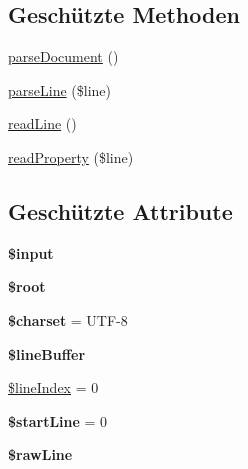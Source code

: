 \subsection*{Geschützte Methoden}
\begin{DoxyCompactItemize}
\item 
\mbox{\hyperlink{class_sabre_1_1_v_object_1_1_parser_1_1_mime_dir_ad1f7ba30d0dba703bfe54a3e3d314f38}{parse\+Document}} ()
\item 
\mbox{\hyperlink{class_sabre_1_1_v_object_1_1_parser_1_1_mime_dir_a4b695104272796834e37bb428c0ad629}{parse\+Line}} (\$line)
\item 
\mbox{\hyperlink{class_sabre_1_1_v_object_1_1_parser_1_1_mime_dir_ad6b4cd149ad202f7aaa162844d484665}{read\+Line}} ()
\item 
\mbox{\hyperlink{class_sabre_1_1_v_object_1_1_parser_1_1_mime_dir_a59f31eadb05920e4ab6de183e02870bb}{read\+Property}} (\$line)
\end{DoxyCompactItemize}
\subsection*{Geschützte Attribute}
\begin{DoxyCompactItemize}
\item 
\mbox{\label{class_sabre_1_1_v_object_1_1_parser_1_1_mime_dir_ab4df6a9f5d7d433b954b5adb6e08ccb9}} 
{\bfseries \$input}
\item 
\mbox{\label{class_sabre_1_1_v_object_1_1_parser_1_1_mime_dir_a49c0dfbae52ea8694721dc062057de4b}} 
{\bfseries \$root}
\item 
\mbox{\label{class_sabre_1_1_v_object_1_1_parser_1_1_mime_dir_ab96f90cb247c15eb6e16b45ac0036a43}} 
{\bfseries \$charset} = \textquotesingle{}U\+TF-\/8\textquotesingle{}
\item 
\mbox{\label{class_sabre_1_1_v_object_1_1_parser_1_1_mime_dir_a60ef485f8fa8f584eea8b0e57dfad1d7}} 
{\bfseries \$line\+Buffer}
\item 
\mbox{\hyperlink{class_sabre_1_1_v_object_1_1_parser_1_1_mime_dir_a7a102a9b975652f12751fffc863edb86}{\$line\+Index}} = 0
\item 
\mbox{\label{class_sabre_1_1_v_object_1_1_parser_1_1_mime_dir_a9180863ec323c3b35c57e9ca97863d3f}} 
{\bfseries \$start\+Line} = 0
\item 
\mbox{\label{class_sabre_1_1_v_object_1_1_parser_1_1_mime_dir_a453ca557e5af4d7a85afb73b5e1636b3}} 
{\bfseries \$raw\+Line}
\end{DoxyCompactItemize}
